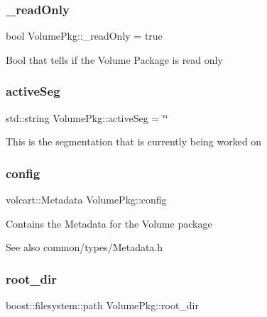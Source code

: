 \subsubsection{\texorpdfstring{\+\_\+read\+Only}{\_readOnly}}
{\footnotesize\ttfamily bool Volume\+Pkg\+::\+\_\+read\+Only = true\hspace{0.3cm}{\ttfamily [private]}}

Bool that tells if the Volume Package is read only \hypertarget{classVolumePkg_a192921e57935c16e2e92c2ede350e08a}{}\label{classVolumePkg_a192921e57935c16e2e92c2ede350e08a} 
\subsubsection{\texorpdfstring{active\+Seg}{activeSeg}}
{\footnotesize\ttfamily std\+::string Volume\+Pkg\+::active\+Seg = \char`\"{}\char`\"{}\hspace{0.3cm}{\ttfamily [private]}}

This is the segmentation that is currently being worked on \hypertarget{classVolumePkg_a01960fbb8a1dec9da54f5e2468baeb0e}{}\label{classVolumePkg_a01960fbb8a1dec9da54f5e2468baeb0e} 
\subsubsection{\texorpdfstring{config}{config}}
{\footnotesize\ttfamily volcart\+::\+Metadata Volume\+Pkg\+::config\hspace{0.3cm}{\ttfamily [private]}}

Contains the Metadata for the Volume package \begin{DoxySeeAlso}{See also}
common/types/\+Metadata.\+h 
\end{DoxySeeAlso}
\hypertarget{classVolumePkg_a564d5b92303bb807979d0ab09afa8eec}{}\label{classVolumePkg_a564d5b92303bb807979d0ab09afa8eec} 
\subsubsection{\texorpdfstring{root\+\_\+dir}{root\_dir}}
{\footnotesize\ttfamily boost\+::filesystem\+::path Volume\+Pkg\+::root\+\_\+dir\hspace{0.3cm}{\ttfamily [private]}}

